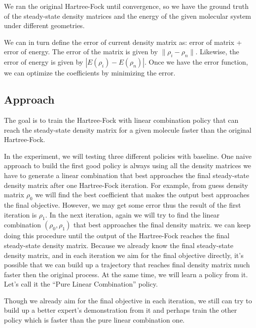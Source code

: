 \documentclass[twoside]{article}
\begin{document}
We ran the original Hartree-Fock until convergence, so we have the ground truth of the steady-state density matrices and the energy of the given molecular system under different geometries. 

We can in turn define the error of current density matrix as: error of matrix +  error of energy. The error of the matrix is given by $\|\rho_i-\rho_n\|$. Likewise, the error of energy is given by $|E(\rho_i)-E(\rho_n)|$. Once we have the error function, we can optimize the coefficients by minimizing the error.




\subsection{Approach}
The goal is to train the Hartree-Fock with linear combination policy that can reach the steady-state density matrix for a given molecule faster than the original Hartree-Fock.

In the experiment, we will testing three different policies with baseline.
One naive approach to build the first good policy is always using all the density matrices we have to generate a linear combination that best approaches the final steady-state density matrix after one Hartree-Fock iteration.  For example, from guess density matrix $\rho_0$ we will find the best coefficient that makes the output best approaches the final objective. However, we may get some error thus the result of the first iteration is $\rho_1$.  In the next iteration, again we will try to find the linear combination $(\rho_0, \rho_1)$ that best approaches the final density matrix. we can keep doing this procedure until the output of the Hartree-Fock reaches the final steady-state density matrix.
Because we already know the final steady-state density matrix, and in each iteration we aim for the final objective directly, it's possible that we can build up a trajectory that reaches final density matrix much faster then the original process. At the same time, we will learn a policy from it. Let's call it the ``Pure Linear Combination'' policy.

Though we already aim for the final objective in each iteration, we still can try to build up a better expert's demonstration from it and perhaps train the other policy which is faster than the pure linear combination one.
\end{document}
